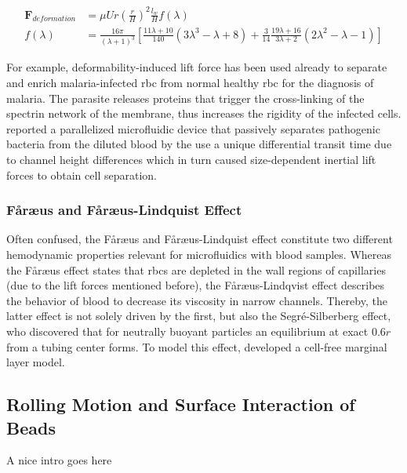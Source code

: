 \begin{align}
	\mathbf{F}_{deformation}&=\mu U r \left(\frac{r}{H}\right)^{2} \frac{l_w}{H} f\left(\lambda\right) \label{eq:f:deform}\\
	f(\lambda) &=\frac{16 \pi}{\left(\lambda+1\right)^{3}}\left[\frac{11 \lambda+10}{140}\left(3 \lambda^{3}-\lambda+8\right)+\frac{3}{14} \frac{19 \lambda+16}{3 \lambda+2}\left(2 \lambda^{2}-\lambda-1\right)\right] 
\end{align}

For example, deformability-induced  lift  force  has  been  used  already to  separate  and  enrich  malaria-infected \gls{rbc}  from  normal  healthy  \gls{rbc} for  the  diagnosis  of  malaria.  The parasite releases proteins that trigger the cross-linking of the spectrin network of the membrane, thus increases the rigidity of the infected cells.\cite{lit:fluid:deformability}
\citet{lit:fluid:deformabilityDiCarlo} reported a parallelized  microfluidic  device  that  passively separates pathogenic bacteria from the diluted blood by the use a unique differential transit time due to channel height differences which in turn caused size-dependent inertial  lift forces to obtain cell separation.

\subsubsection{F\aa{}r\ae{}us and F\aa{}r\ae{}us-Lindquist Effect}
Often confused, the F\aa{}r\ae{}us and F\aa{}r\ae{}us-Lindquist effect constitute two different hemodynamic properties relevant for microfluidics with blood samples. Whereas the  F\aa{}r\ae{}us effect states that \glspl{rbc} are depleted in the wall regions of capillaries (due to the lift forces mentioned before), the F\aa{}r\ae{}us-Lindqvist effect describes the behavior of blood to decrease its viscosity in narrow channels.\cite{lit:fluid:faraeus, lit:fluid:faraeuslinquvist} Thereby, the latter effect is not solely driven by the first, but also the Segr\'{e}-Silberberg effect, who discovered that for neutrally buoyant particles an equilibrium at exact $0.6r$ from a tubing center forms.\cite{lit:fluid:silberbereffect} To model this effect, \citet{lit:fluid:cell-free-model} developed a cell-free marginal layer model.


\subsection{Rolling Motion and Surface Interaction of Beads}
\label{sec:theo:rolling}
A nice intro goes here
